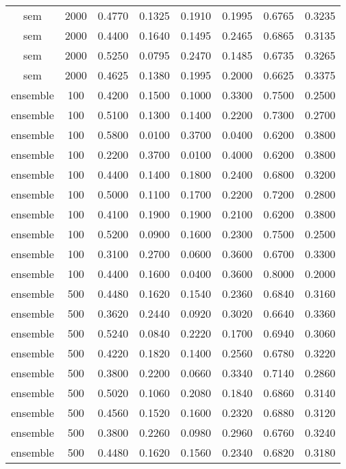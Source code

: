 \begin{scriptsize}
\begin{longtable}{cccccccc}
	sem      & 2000 & 0.4770 & 0.1325 & 0.1910 & 0.1995 & 0.6765 & 0.3235 \\
	sem      & 2000 & 0.4400 & 0.1640 & 0.1495 & 0.2465 & 0.6865 & 0.3135 \\
	sem      & 2000 & 0.5250 & 0.0795 & 0.2470 & 0.1485 & 0.6735 & 0.3265 \\
	sem      & 2000 & 0.4625 & 0.1380 & 0.1995 & 0.2000 & 0.6625 & 0.3375 \\
	ensemble & 100  & 0.4200 & 0.1500 & 0.1000 & 0.3300 & 0.7500 & 0.2500 \\
	ensemble & 100  & 0.5100 & 0.1300 & 0.1400 & 0.2200 & 0.7300 & 0.2700 \\
	ensemble & 100  & 0.5800 & 0.0100 & 0.3700 & 0.0400 & 0.6200 & 0.3800 \\
	ensemble & 100  & 0.2200 & 0.3700 & 0.0100 & 0.4000 & 0.6200 & 0.3800 \\
	ensemble & 100  & 0.4400 & 0.1400 & 0.1800 & 0.2400 & 0.6800 & 0.3200 \\
	ensemble & 100  & 0.5000 & 0.1100 & 0.1700 & 0.2200 & 0.7200 & 0.2800 \\
	ensemble & 100  & 0.4100 & 0.1900 & 0.1900 & 0.2100 & 0.6200 & 0.3800 \\
	ensemble & 100  & 0.5200 & 0.0900 & 0.1600 & 0.2300 & 0.7500 & 0.2500 \\
	ensemble & 100  & 0.3100 & 0.2700 & 0.0600 & 0.3600 & 0.6700 & 0.3300 \\
	ensemble & 100  & 0.4400 & 0.1600 & 0.0400 & 0.3600 & 0.8000 & 0.2000 \\
	ensemble & 500  & 0.4480 & 0.1620 & 0.1540 & 0.2360 & 0.6840 & 0.3160 \\
	ensemble & 500  & 0.3620 & 0.2440 & 0.0920 & 0.3020 & 0.6640 & 0.3360 \\
	ensemble & 500  & 0.5240 & 0.0840 & 0.2220 & 0.1700 & 0.6940 & 0.3060 \\
	ensemble & 500  & 0.4220 & 0.1820 & 0.1400 & 0.2560 & 0.6780 & 0.3220 \\
	ensemble & 500  & 0.3800 & 0.2200 & 0.0660 & 0.3340 & 0.7140 & 0.2860 \\
	ensemble & 500  & 0.5020 & 0.1060 & 0.2080 & 0.1840 & 0.6860 & 0.3140 \\
	ensemble & 500  & 0.4560 & 0.1520 & 0.1600 & 0.2320 & 0.6880 & 0.3120 \\
	ensemble & 500  & 0.3800 & 0.2260 & 0.0980 & 0.2960 & 0.6760 & 0.3240 \\
	ensemble & 500  & 0.4480 & 0.1620 & 0.1560 & 0.2340 & 0.6820 & 0.3180 \\

\end{longtable}
\end{scriptsize}

